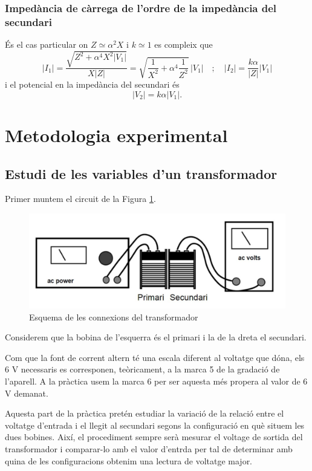 \documentclass[a4paper,10.5pt]{report}
\begin{document}
\subsubsection{Impedància de càrrega de l'ordre de la impedància del secundari}
És el cas particular on $Z \simeq \alpha^2X$ i $k \simeq 1$ es compleix que
\begin{equation}
	|I_1| = \frac{\sqrt{Z^2 + \alpha^4 X^2 |V_1|}}{X |Z|} = \sqrt{ \frac{1}{X^2} + \alpha^4 \frac{1}{Z^2} } \, |V_1| 
	\quad ; \quad |I_2| = \frac{k \alpha}{|Z|} |V_1|
	\label{eq4:23}
\end{equation}
i el potencial en la impedància del secundari és
\begin{equation}
	|V_2| = k \alpha |V_1|.
	\label{eq4:24}
\end{equation}

\section{Metodologia experimental}
\subsection{Estudi de les variables d'un transformador}
Primer muntem el circuit de la Figura \ref{fig4:1}.

\begin{figure}[h]
	\centering
	\includegraphics[width=0.38\linewidth]{screenshot007}
	\caption{Esquema de les connexions del transformador}
	\label{fig4:1}
\end{figure}

Considerem que la bobina de l'esquerra és el primari i la de la dreta el secundari.

Com que la font de corrent altern té una escala diferent al voltatge que dóna, els 6 V necessaris es corresponen, teòricament, a la marca 5 de la gradació de l'aparell. A la pràctica usem la marca 6 per ser aquesta més propera al valor de 6 V demanat.

Aquesta part de la pràctica pretén estudiar la variació de la relació entre el voltatge d'entrada i el llegit al secundari segons la configuració en què situem les dues bobines. Així, el procediment sempre serà mesurar el voltage de sortida del transformador i comparar-lo amb el valor d'entrda per tal de determinar amb quina de les configuracions obtenim una lectura de voltatge major.
\end{document}
